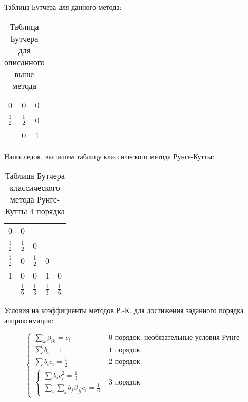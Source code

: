 \documentclass[10pt,a4paper]{article}
\begin{document}
Таблица Бутчера для данного метода:		
		
		\begin{table}[h!]
\centering
\begin{tabular}{l|ll}
\multicolumn{1}{l|}{0}             & 0             & 0 \\
\multicolumn{1}{l|}{$\frac{1}{2}$} & $\frac{1}{2}$ & 0 \\ \hline
                                   & 0             & 1
\end{tabular}
\caption{Таблица Бутчера для описанного выше метода}
\label{tab:Butcher_tab_example_1}
\end{table}

		Напоследок, выпишем таблицу классического метода Рунге-Кутты:
		
		\begin{table}[h!]
\centering
\begin{tabular}{l|llll}
\multicolumn{1}{l|}{0}             & 0             &               &               
&               \\
\multicolumn{1}{l|}{$\frac{1}{2}$} & $\frac{1}{2}$ & 0             &               
&               \\
\multicolumn{1}{l|}{$\frac{1}{2}$} & 0             & $\frac{1}{2}$ & 0             
&               \\
\multicolumn{1}{l|}{1}             & 0             & 0             & 1             
& 0             \\ \hline
                                   & $\frac{1}{6}$ & $\frac{1}{3}$ & $\frac{1}
                                   {3}$ & $\frac{1}{6}$
\end{tabular}
\caption{Таблица Бутчера классического метода Рунге-Кутты 4 порядка}
\label{tab:classic_Runge_Cutt}
\end{table}

		Условия на коэффициенты методов Р.-К. для достижения заданного порядка 
		аппроксимации:
		
		\begin{equation}
			\begin{cases}
				\sum\limits_{k}\beta_{ik} = c_{i} \ \ &\text{0 порядок, 
				необязательные условия Рунге}
				\\
				\sum b_{i} = 1&\text{1 порядок}
				\\
				\sum b_{i}c_{i} = \frac{1}{2}&\text{2 порядок}
				\\
				\begin{cases}
					\sum b_{i}c_{i}^{2} = \frac{1}{3}
					\\
					\sum\limits_{i}\sum\limits_{j}b_{j}\beta_{ji}c_{i} = 
					\frac{1}{6}
				\end{cases}&\text{3 порядок}
			\end{cases}
		\end{equation}
		
		
\end{document}
